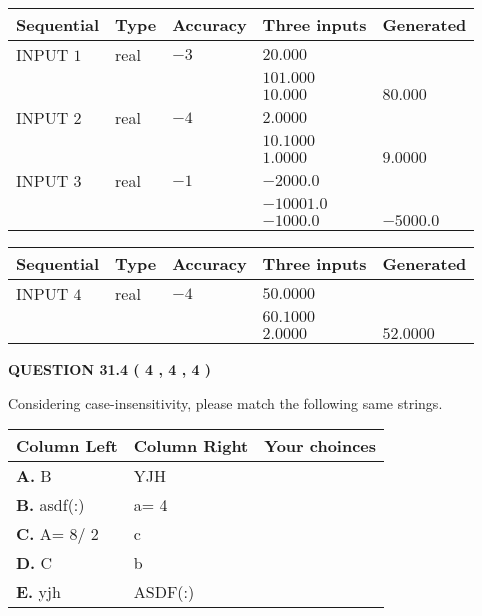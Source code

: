 \documentclass[12pt]{article}
\begin{document}
  
\noindent\begin{tabular}{|l|l|l|l|l|}
\hline
 Sequential & Type & Accuracy & Three inputs & Generated \\ 
\hline
 
 
  INPUT $            1 $ & real & $           -3  $ & $
 20.000
  $ & \\
  & & &  $
 101.000
  $ & \\
  & & &  $
 10.000
 $ & $ 80.000 $ 
 \\  \hline  
 
 
  INPUT $            2 $ & real & $           -4  $ & $
 2.0000
  $ & \\
  & & &  $
 10.1000
  $ & \\
  & & &  $
 1.0000
 $ & $ 9.0000 $ 
 \\  \hline  
 
 
  INPUT $            3 $ & real & $           -1  $ & $
 -2000.0
  $ & \\
  & & &  $
 -10001.0
  $ & \\
  & & &  $
 -1000.0
 $ & $ -5000.0 $ 
 \\  \hline  
 \end{tabular}
   
   
  
  
\noindent\begin{tabular}{|l|l|l|l|l|}
\hline
 Sequential & Type & Accuracy & Three inputs & Generated \\ 
\hline
 
 
  INPUT $            4 $ & real & $           -4  $ & $
 50.0000
  $ & \\
  & & &  $
 60.1000
  $ & \\
  & & &  $
 2.0000
 $ & $ 52.0000 $ 
 \\  \hline  
 \end{tabular}
   
   
  
\vspace{0.2in}
  
{\textbf{\Large{QUESTION
31.4 
 (           4 ,           4 ,           4 )
}}}
  
  
Considering case-insensitivity, please match the following same strings.
  
  
\begin{tabular}{|l|l|l|}
 \hline
 Column Left & Column Right  & Your choinces \\ 
 \hline
{\textbf{\large{
A.}}}
B
  & 
YJH
 & 
 \\ 
 \hline
{\textbf{\large{
B.}}}
asdf(:)
  & 
 a= %
4
 & 
 \\ 
 \hline
{\textbf{\large{
C.}}}
 A= %
8/ %
2

  & 
c
 & 
 \\ 
 \hline
{\textbf{\large{
D.}}}
C
  & 
b
 & 
 \\ 
 \hline
{\textbf{\large{
E.}}}
yjh
  & 
ASDF(:)
 & 
 \\ 
 \hline
 \end{tabular}
  
\end{document}
